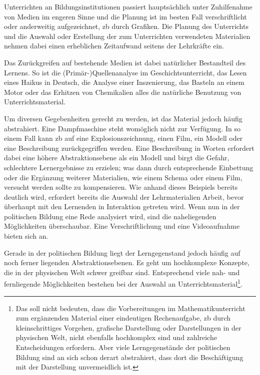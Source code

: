 Unterrichten an Bildungsinstitutionen passiert hauptsächlich unter Zuhilfenahme von Medien im engeren Sinne und die Planung ist im besten Fall verschriftlicht oder anderweitig aufgezeichnet, \gls{zb} durch Grafiken. Die Planung des Unterrichts und die Auswahl oder Erstellung der zum Unterrichten verwendeten Materialien nehmen dabei einen erheblichen Zeitaufwand seitens der Lehrkräfte ein.

Das Zurückgreifen auf bestehende Medien ist dabei natürlicher Bestandteil des Lernens. So ist die (Primär-)Quellenanalyse im Geschichtsunterricht, das Lesen eines Haikus in Deutsch, die Analyse einer Inszenierung, das Basteln an einem Motor oder das Erhitzen von Chemikalien alles die natürliche Benutzung von Unterrichtsmaterial. 


Um diversen Gegebenheiten gerecht zu werden, ist das Material jedoch häufig abstrahiert. Eine Dampfmaschine steht womöglich nicht zur Verfügung. In so einem Fall kann \gls{zb} auf eine Explosionszeichnung, einen Film, ein Modell oder eine Beschreibung zurückgegriffen werden. Eine Beschreibung in Worten erfordert dabei eine höhere Abstraktionsebene als ein Modell und birgt die Gefahr, schlechtere Lernergebnisse zu erzielen; was dann durch entsprechende Einbettung oder die Ergänzung weiterer Materialien, wie einem Schema oder einem Film, versucht werden sollte zu kompensieren. Wie anhand dieses Beispiels bereits deutlich wird, erfordert bereits die Auswahl der Lehrmaterialien Arbeit, bevor überhaupt mit den Lernenden in Interaktion getreten wird. 
Wenn nun in der politischen Bildung eine Rede analysiert wird, sind die naheliegenden Möglichkeiten überschaubar. Eine Verschriftlichung und eine Videoaufnahme bieten sich an. 

Gerade in der politischen Bildung liegt der Lerngegenstand jedoch häufig auf noch ferner liegenden Abstraktionsebenen. Es geht um hochkomplexe Konzepte, die in der physischen Welt schwer greifbar sind. Entsprechend viele nah- und fernliegende Möglichkeiten bestehen bei der Auswahl an Unterrichtsmaterial\footnote{Das soll nicht bedeuten, dass die Vorbereitungen im Mathematikunterricht zum ergänzenden Material einer eindeutigen Rechenaufgabe, \gls{zb} durch kleinschrittiges Vorgehen, grafische Darstellung oder Darstellungen in der physischen Welt, nicht ebenfalls hochkomplex sind und zahlreiche Entscheidungen erfordern. Aber viele Lerngegenstände der politischen Bildung sind an sich schon derart abstrahiert, dass dort die Beschäftigung mit der Darstellung unvermeidlich ist.}.

